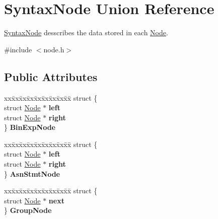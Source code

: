\hypertarget{union_syntax_node}{}\section{Syntax\+Node Union Reference}
\label{union_syntax_node}


\mbox{\hyperlink{union_syntax_node}{Syntax\+Node}} desscribes the data stored in each \mbox{\hyperlink{struct_node}{Node}}.  




{\ttfamily \#include $<$node.\+h$>$}

\subsection*{Public Attributes}
\begin{DoxyCompactItemize}
\item 
\mbox{\label{union_syntax_node_a293c7a07bce7cebb1b2b02184f6e86ec}} 
\begin{tabbing}
xx\=xx\=xx\=xx\=xx\=xx\=xx\=xx\=xx\=\kill
struct \{\\
\>struct \mbox{\hyperlink{struct_node}{Node}} $\ast$ {\bfseries left}\\
\>struct \mbox{\hyperlink{struct_node}{Node}} $\ast$ {\bfseries right}\\
\} {\bfseries BinExpNode}\\

\end{tabbing}\item 
\mbox{\label{union_syntax_node_a45a8e1d2ff6f81191be9a573a37f71e7}} 
\begin{tabbing}
xx\=xx\=xx\=xx\=xx\=xx\=xx\=xx\=xx\=\kill
struct \{\\
\>struct \mbox{\hyperlink{struct_node}{Node}} $\ast$ {\bfseries left}\\
\>struct \mbox{\hyperlink{struct_node}{Node}} $\ast$ {\bfseries right}\\
\} {\bfseries AsnStmtNode}\\

\end{tabbing}\item 
\mbox{\label{union_syntax_node_a686dc3844112759eeeafde6abddbc3dc}} 
\begin{tabbing}
xx\=xx\=xx\=xx\=xx\=xx\=xx\=xx\=xx\=\kill
struct \{\\
\>struct \mbox{\hyperlink{struct_node}{Node}} $\ast$ {\bfseries next}\\
\} {\bfseries GroupNode}\\

\end{tabbing}\end{DoxyCompactItemize}


